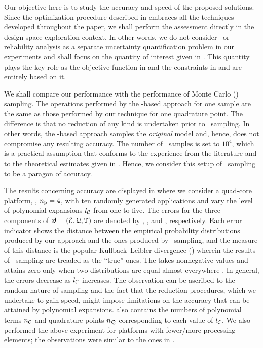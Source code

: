 Our objective here is to study the accuracy and speed of the proposed solutions.
Since the optimization procedure described in  embraces all the techniques developed throughout the paper, we shall perform the assessment directly in the design-space-exploration context.
In other words, we do not consider \ta\ or reliability analysis as a separate uncertainty quantification problem in our experiments and shall focus on the quantity of interest given in .
This quantity plays the key role as the objective function in  and the constraints in  and  are entirely based on it.

We shall compare our performance with the performance of Monte Carlo (\MC) sampling.
The operations performed by the \MC-based approach for one sample are the same as those performed by our technique for one quadrature point.
The difference is that no reduction of any kind is undertaken prior to \MC\ sampling.
In other words, the \MC-based approach samples the \emph{original} model and, hence, does not compromise any resulting accuracy.
The number of \MC\ samples is set to $10^4$, which is a practical assumption that conforms to the experience from the literature \cite{ukhov2014, lee2013, juan2012, xiang2010} and to the theoretical estimates given in \cite{diaz-emparanza2002}.
Hence, we consider this setup of \MC\ sampling to be a paragon of accuracy.


The results concerning accuracy are displayed in  where we consider a quad-core platform, \ie, ${n_\text{p}} = 4$, with ten randomly generated applications and vary the level of polynomial expansions ${l_\mathcal{C}}$ from one to five.
The errors for the three components of $\bm{\vartheta} = (\EuScript{E}, \EuScript{Q}, \EuScript{T})$ are denoted by \errorE, \errorQ, and \errorT, respectively.
Each error indicator shows the distance between the empirical probability distributions produced by our approach and the ones produced by \MC\ sampling, and the measure of this distance is the popular Kullback--Leibler divergence () wherein the results of \MC\ sampling are treaded as the ``true'' ones.
The  takes nonnegative values and attains zero only when two distributions are equal almost everywhere \cite{durrett2010}.
In general, the errors decrease as ${l_\mathcal{C}}$ increases.
The observation can be ascribed to the random nature of sampling and the fact that the reduction procedures, which we undertake to gain speed, might impose limitations on the accuracy that can be attained by polynomial expansions.
 also contains the numbers of polynomial terms ${n_\mathcal{C}}$ and quadrature points ${n_\mathcal{Q}}$ corresponding to each value of ${l_\mathcal{C}}$.
We also performed the above experiment for platforms with fewer/more processing elements; the observations were similar to the ones in .

